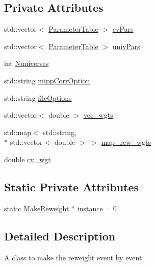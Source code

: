 \subsection*{Private Attributes}
\begin{DoxyCompactItemize}
\item 
std\-::vector$<$ \hyperlink{class_neutrino_flux_reweight_1_1_parameter_table}{Parameter\-Table} $>$ \hyperlink{class_neutrino_flux_reweight_1_1_make_reweight_a5146359dee518a9cbc8eafd78ab32f5b}{cv\-Pars}
\item 
std\-::vector$<$ \hyperlink{class_neutrino_flux_reweight_1_1_parameter_table}{Parameter\-Table} $>$ \hyperlink{class_neutrino_flux_reweight_1_1_make_reweight_a3c94d871d61417aeb2c86c21af485582}{univ\-Pars}
\item 
int \hyperlink{class_neutrino_flux_reweight_1_1_make_reweight_a172e839a27e6c89dbaf9cb493c99bbef}{Nuniverses}
\item 
std\-::string \hyperlink{class_neutrino_flux_reweight_1_1_make_reweight_a642f0605b4a34674afaf5add7512c66a}{mipp\-Corr\-Option}
\item 
std\-::string \hyperlink{class_neutrino_flux_reweight_1_1_make_reweight_ae182e413fc79d37ae640a37edea61555}{file\-Options}
\item 
std\-::vector$<$ double $>$ \hyperlink{class_neutrino_flux_reweight_1_1_make_reweight_ae164934137effb838289662f0f65c489}{vec\-\_\-wgts}
\item 
std\-::map$<$ std\-::string, \\*
std\-::vector$<$ double $>$ $>$ \hyperlink{class_neutrino_flux_reweight_1_1_make_reweight_a2310ee6ae4dd8e0cd2d58c089192e38a}{map\-\_\-rew\-\_\-wgts}
\item 
double \hyperlink{class_neutrino_flux_reweight_1_1_make_reweight_abb823dae6f381aa78ee9cbbffeafc3d4}{cv\-\_\-wgt}
\end{DoxyCompactItemize}
\subsection*{Static Private Attributes}
\begin{DoxyCompactItemize}
\item 
static \hyperlink{class_neutrino_flux_reweight_1_1_make_reweight}{Make\-Reweight} $\ast$ \hyperlink{class_neutrino_flux_reweight_1_1_make_reweight_a75fcb02b8cf89ed906f143d3b782b27a}{instance} = 0
\end{DoxyCompactItemize}


\subsection{Detailed Description}
A class to make the reweight event by event. 

